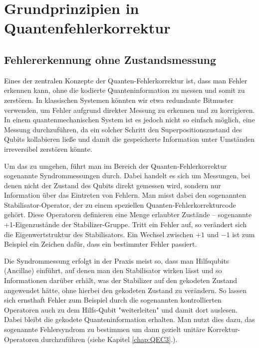 \section{Grundprinzipien in Quantenfehlerkorrektur}\label{chap:QEC2}
\subsection{Fehlererkennung ohne Zustandsmessung}
Eines der zentralen Konzepte der Quanten-Fehlerkorrektur ist, dass man Fehler erkennen kann, ohne die kodierte Quanteninformation zu messen und somit zu zerstören. In klassischen Systemen könnten wir etwa redundante Bitmuster verwenden, um Fehler aufgrund direkter Messung zu erkennen und zu korrigieren. In einem quantenmechanischen System ist es jedoch nicht so einfach möglich, eine Messung durchzuführen, da ein solcher Schritt den Superpositionszustand des Qubits kollabieren ließe und damit die gespeicherte Information unter Umständen irreversibel zerstören könnte. \cite{nielsen_michael_a_and_isaac_l_chuang_quantum_2010}

Um das zu umgehen, führt man im Bereich der Quanten-Fehlerkorrektur sogenannte Syndrommessungen durch. Dabei handelt es sich um Messungen, bei denen nicht der Zustand des Qubits direkt gemessen wird, sondern nur Information über das Eintreten von Fehlern. Man misst dabei den sogenannten Stabilisator-Operator, der zu einem speziellen Quanten-Fehlerkorrekturcode gehört. Diese Operatoren definieren eine Menge erlaubter Zustände – sogenannte +1-Eigenzustände der Stabilizer-Gruppe. Tritt ein Fehler auf, so verändert sich die Eigenwertstruktur des Stabilisators. Ein Wechsel zwischen \(+1\) und \(-1\) ist zum Beispiel ein  Zeichen dafür, dass ein bestimmter Fehler passiert. \cite[Seite 444-446]{nielsen_michael_a_and_isaac_l_chuang_quantum_2010}

Die Syndrommessung erfolgt in der Praxis meist so, dass man Hilfsqubits (Ancillae) einführt, auf denen man den Stabilisator wirken lässt und so Informationen darüber erhält, was der Stabilizer auf den gekodeten Zustand angewendet hätte, ohne hierbei den gekodeten Zustand zu verändern. So lassen sich ernsthaft Fehler zum Beispiel durch die sogenannten kontrollierten Operatoren auch zu dem Hilfs-Qubit "weiterleiten" und damit dort auslesen. Dabei bleibt die gekodete Quanteninformation erhalten. Man nutzt dies dazu, das sogenannte Fehlersyndrom zu bestimmen um dann gezielt unitäre Korrektur-Operatoren durchzuführen (siehe Kapitel \ref{chap:QEC3}.). \cite[Seite 444-446]{nielsen_michael_a_and_isaac_l_chuang_quantum_2010}


